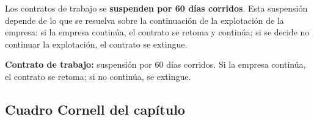 \documentclass[12pt,oneside]{book}
\begin{document}
Los contratos de trabajo se \textbf{suspenden por 60 días corridos}. Esta suspensión depende de lo que se resuelva sobre la continuación de la explotación de la empresa: si la empresa continúa, el contrato se retoma y continúa; si se decide no continuar la explotación, el contrato se extingue.

\begin{important}
\textbf{Contrato de trabajo:} suspensión por 60 días corridos. Si la empresa continúa, el contrato se retoma; si no continúa, se extingue.
\end{important}

\subsection*{Cuadro Cornell del capítulo}
\end{document}
